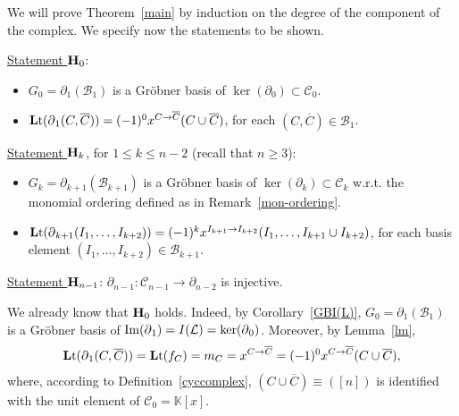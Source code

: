 \documentclass[ALCO]{cedram}
\newcommand{\mbk}{\mbox{$\mathbb{K}$}}
\newcommand{\lt}{\mbox{${\bf L}{\rm t}$}}
\newcommand{\mcb}{\mbox{$\mathcal{B}$}}
\newcommand{\mcc}{\mbox{$\mathcal{C}$}}
\newcommand{\mcl}{\mbox{$\mathcal{L}$}}
\newcommand{\mbfh}{\mbox{${\bf H}$}}
\newcommand{\dif}{\mbox{$\partial$}}
\begin{document}
\begin{notation}\label{hyphk} 
We will prove Theorem~\ref{main} by induction on the degree of the
component of the complex. We specify now the statements to be shown.

\underline{Statement $\mbfh_0$}:
\begin{itemize}
\item[$(a)$] $G_{0}=\dif_{1}(\mcb_{1})$ is a Gr\"obner basis of
  $\ker(\dif_{0})\subset\mcc_{0}$.
\item[$(b)$] $\lt(\dif_{1}(C,\overline{C}))=
  (-1)^0x^{C\to\overline{C}}(C\cup\overline{C})$, for each
  $(C,\overline{C})\in\mcb_{1}$.
\end{itemize}

\underline{Statement $\mbfh_k$}, for $1\leq k\leq n-2$ (recall that
$n\geq 3$):
\begin{itemize}
\item[$(a)$] $G_{k}=\dif_{k+1}(\mcb_{k+1})$ is a Gr\"obner basis of
  $\ker(\dif_{k})\subset\mcc_{k}$ w.r.t. the monomial ordering defined
  as in Remark~\ref{mon-ordering}.
\item[$(b)$] $\lt(\dif_{k+1}(I_1,\ldots
  ,I_{k+2}))=(-1)^{k}x^{I_{k+1}\to I_{k+2}}(I_1,\ldots ,I_{k+1}\cup
  I_{k+2})$, for each basis element $(I_1,\ldots
  ,I_{k+2})\in\mcb_{k+1}$.
\end{itemize}

\underline{Statement $\mbfh_{n-1}$}:
$\dif_{n-1}:\mcc_{n-1}\to\dif_{n-2}$ is injective.
\end{notation}

\begin{remark}\label{degree0}
We already know that $\mbfh_0$ holds. Indeed, by
Corollary~\ref{GBI(L)}, $G_0=\dif_1(\mcb_1)$ is a Gr\"obner basis of
${\rm Im}(\dif_1)=I(\mcl)=\ker(\dif_0)$. Moreover, by Lemma~\ref{lm},
\begin{eqnarray*}
\lt(\dif_1(C,\overline{C}))=\lt(f_C)=m_C=x^{C\to\overline{C}}=
(-1)^0x^{C\to\overline{C}}(C\cup\overline{C}),
\end{eqnarray*}
where, according to Definition~\ref{cyccomplex}, $(C\cup
\overline{C})\equiv ([n])$ is identified with the unit element of
$\mcc_0=\mbk[x]$.
\end{remark}
\end{document}
